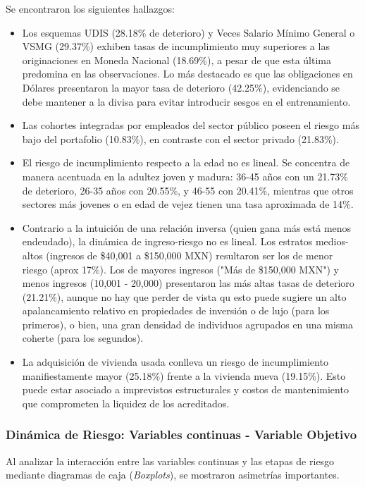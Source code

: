 Se encontraron los siguientes hallazgos:
\begin{itemize}
	\item Los esquemas UDIS (28.18\% de deterioro) y Veces Salario Mínimo General o VSMG (29.37\%) exhiben tasas de incumplimiento muy superiores a las originaciones en Moneda Nacional (18.69\%), a pesar de que esta última predomina en las observaciones. Lo más destacado es que las obligaciones en Dólares presentaron la mayor tasa de deterioro (42.25\%), evidenciando se debe mantener a la divisa para evitar introducir sesgos en el entrenamiento.
	\item Las cohortes integradas por empleados del sector público poseen el riesgo más bajo del portafolio (10.83\%), en contraste con el sector privado (21.83\%).
	\item El riesgo de incumplimiento respecto a la edad no es lineal. Se concentra de manera acentuada en la adultez joven y madura: 36-45 años con un 21.73\% de deterioro, 26-35 años con 20.55\%, y 46-55 con 20.41\%, mientras que otros sectores más jovenes o en edad de vejez tienen una tasa aproximada de 14\%.
	\item Contrario a la intuición de una relación inversa (quien gana más está menos endeudado), la dinámica de ingreso-riesgo no es lineal. Los estratos medios-altos (ingresos de \$40,001 a \$150,000 MXN) resultaron ser los de menor riesgo (aprox 17\%). Los de mayores ingresos ("Más de \$150,000 MXN") y menos ingresos (10,001 - 20,000)  presentaron las más altas tasas de deterioro (21.21\%), aunque no hay que perder de vista qu esto puede sugiere un alto apalancamiento relativo en propiedades de inversión o de lujo (para los primeros), o bien, una gran densidad de individuos agrupados en una misma coherte (para los segundos).
	\item La adquisición de vivienda usada conlleva un riesgo de incumplimiento manifiestamente mayor (25.18\%) frente a la vivienda nueva (19.15\%). Esto puede estar asociado a imprevistos estructurales y costos de mantenimiento que comprometen la liquidez de los acreditados.
\end{itemize}


\subsubsection{Dinámica de Riesgo: Variables continuas - Variable Objetivo}
Al analizar la interacción entre las variables continuas y las etapas de riesgo mediante diagramas de caja (\textit{Boxplots}), se mostraron asimetrías importantes.

